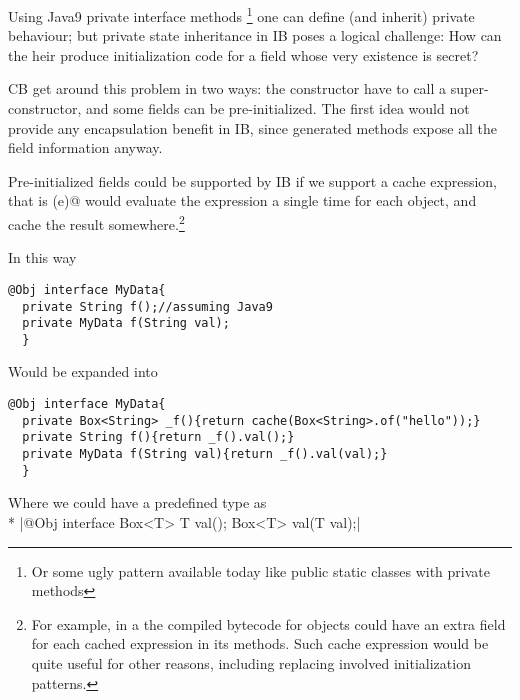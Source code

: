 Using Java9 private interface methods
\footnote{Or some ugly pattern available today like public static classes with private methods}
one can define (and inherit) private behaviour; but private state inheritance in IB poses a logical challenge:
How can the heir produce initialization code for a field whose very existence is secret?

CB get around this problem in two ways: the constructor have to call a super-constructor, and
some fields can be pre-initialized.
The first idea would not provide any encapsulation benefit in IB,
since generated \Q@of@ methods expose all the field information anyway.

Pre-initialized fields could be supported by IB if we support a cache expression,
that is \Q@cache(e)@ would evaluate the expression a single time for each object, and cache the result
somewhere.\footnote{
For example, in a the compiled bytecode for objects
could have an extra field for each cached expression in its methods.
Such cache expression would be quite useful for other reasons,
including replacing involved initialization patterns.}

In this way

\begin{lstlisting}
@Obj interface MyData{
  private String f();//assuming Java9
  private MyData f(String val);
  }
\end{lstlisting}
Would be expanded into 
\begin{lstlisting}
@Obj interface MyData{
  private Box<String> _f(){return cache(Box<String>.of("hello"));}
  private String f(){return _f().val();}
  private MyData f(String val){return _f().val(val);}
  }
\end{lstlisting}

Where we could have a predefined \Q@Box@ type as\\*
\Q|@Obj interface Box<T>{ T val(); Box<T> val(T val);}|




\begin{comment}
\subsection{Class Invariants in ClassLess Java}
Since objects are created by automatically generated methods, another limitation
of our current approach is that there is no place where the user can dynamically
check for class invariants. In Java often we see code like
\begin{lstlisting}
class Point{ int x; int y;
  Point(int x; int y){this.x=x;this.y=y; assert this.checkInvariant();}
  private boolean checkInvariant(){... x>0,y>0...}
}
\end{lstlisting} 

We are considering an extension of our annotation where 
default methods with the special name \Q@checkInvariant()@ will be called inside the \Q@of@ methods.
If multiple interfaces are implemented, and more then one offers
\Q@checkInvariant()@,  a composed implementation could be automatically generated, composing by \Q@&&@ the various competing implementations.
\end{comment}

